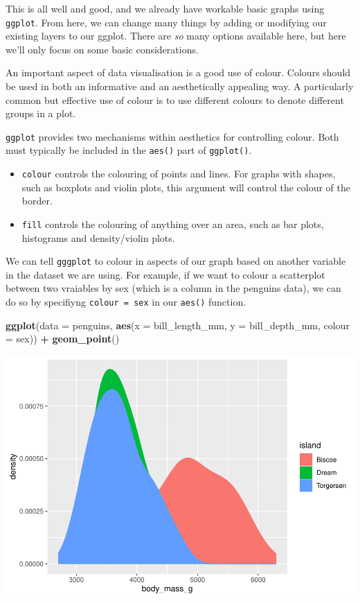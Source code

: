 \documentclass[
]{book}
\newenvironment{Shaded}{\begin{snugshade}}{\end{snugshade}}
\newcommand{\AttributeTok}[1]{\textcolor[rgb]{0.13,0.29,0.53}{#1}}
\newcommand{\FunctionTok}[1]{\textcolor[rgb]{0.13,0.29,0.53}{\textbf{#1}}}
\newcommand{\NormalTok}[1]{#1}
\newcommand{\SpecialCharTok}[1]{\textcolor[rgb]{0.81,0.36,0.00}{\textbf{#1}}}
\providecommand{\tightlist}{%
  \setlength{\itemsep}{0pt}\setlength{\parskip}{0pt}}
\begin{document}
This is all well and good, and we already have workable basic graphs using \texttt{ggplot}. From here, we can change many things by adding or modifying our existing layers to our ggplot. There are \emph{so} many options available here, but here we'll only focus on some basic considerations.

An important aspect of data visualisation is a good use of colour. Colours should be used in both an informative and an aesthetically appealing way. A particularly common but effective use of colour is to use different colours to denote different groups in a plot.

\texttt{ggplot} provides two mechanisms within aesthetics for controlling colour. Both must typically be included in the \texttt{aes()} part of \texttt{ggplot()}.

\begin{itemize}
\tightlist
\item
  \texttt{colour} controls the colouring of points and lines. For graphs with shapes, such as boxplots and violin plots, this argument will control the colour of the border.
\item
  \texttt{fill} controls the colouring of anything over an area, such as bar plots, histograms and density/violin plots.
\end{itemize}

We can tell \texttt{gggplot} to colour in aspects of our graph based on another variable in the dataset we are using. For example, if we want to colour a scatterplot between two vraiables by sex (which is a column in the penguins data), we can do so by specifiyng \texttt{colour\ =\ sex} in our \texttt{aes()} function.

\begin{Shaded}
\begin{Highlighting}[]
\FunctionTok{ggplot}\NormalTok{(}\AttributeTok{data =}\NormalTok{ penguins, }\FunctionTok{aes}\NormalTok{(}\AttributeTok{x =}\NormalTok{ bill\_length\_mm, }\AttributeTok{y =}\NormalTok{ bill\_depth\_mm, }\AttributeTok{colour =}\NormalTok{ sex)) }\SpecialCharTok{+}
  \FunctionTok{geom\_point}\NormalTok{()}
\end{Highlighting}
\end{Shaded}

\includegraphics{_main_files/figure-latex/unnamed-chunk-59-1.pdf}
\end{document}
